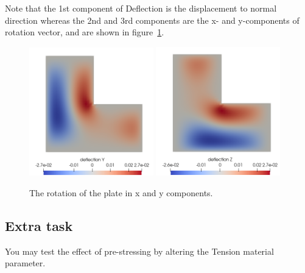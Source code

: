 Note that the 1st component of Deflection is the displacement to normal
direction whereas the 2nd and 3rd components are the x- and y-components of
rotation vector, and are shown in figure~\ref{fig:simplePlateRotation}.


\begin{figure}[tbhp]
\begin{center}
\includegraphics[width=0.48\textwidth]{simplePlateRotationY}
\includegraphics[width=0.48\textwidth]{simplePlateRotationZ}
\end{center}
\caption{The rotation of the plate in x and y components.}
\label{fig:simplePlateRotation}
\end{figure}



\subsection*{Extra task}
You may test the effect of pre-stressing by altering the Tension material parameter.  




\hfill
\mbox{}






